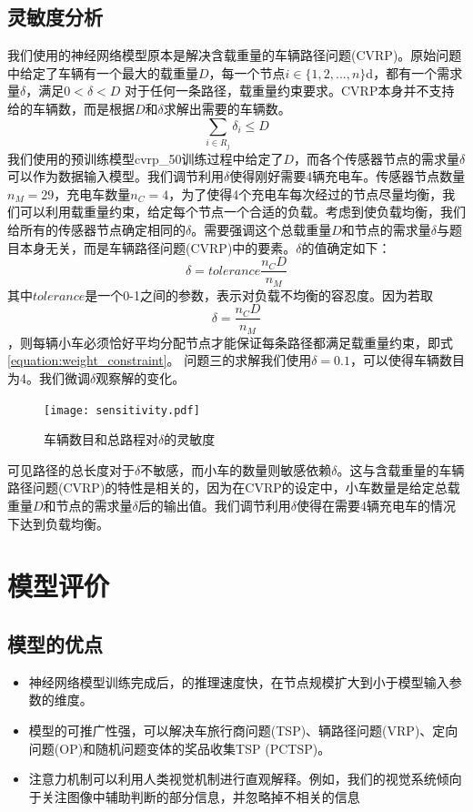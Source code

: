 \documentclass{whutmod}
\begin{document}
\subsection{灵敏度分析}
我们使用的神经网络模型原本是解决含载重量的车辆路径问题(CVRP)。原始问题中给定了车辆有一个最大的载重量$D$，每一个节点$i \in \{1,2,...,n\}$d，都有一个需求量$\delta$，满足$0<\delta<D$
对于任何一条路径，载重量约束要求。CVRP本身并不支持给的车辆数，而是根据$D$和$\delta$求解出需要的车辆数。
\begin{equation}
	\sum_{i \in R_{j}} \delta_{i} \leq D
	\label{equation:weight_constraint}
\end{equation}
我们使用的预训练模型cvrp\_50训练过程中给定了$D$，而各个传感器节点的需求量$\delta$可以作为数据输入模型。我们调节利用$\delta$使得刚好需要4辆充电车。传感器节点数量$n_M=29$，充电车数量$n_C=4$，为了使得4个充电车每次经过的节点尽量均衡，我们可以利用载重量约束，给定每个节点一个合适的负载。考虑到使负载均衡，我们给所有的传感器节点确定相同的$\delta$。需要强调这个总载重量$D$和节点的需求量$\delta$与题目本身无关，而是车辆路径问题(CVRP)中的要素。$\delta$的值确定如下：
\begin{equation}
	\delta = tolerance\frac{n_C D}{n_M}
\end{equation}
其中$tolerance$是一个0-1之间的参数，表示对负载不均衡的容忍度。因为若取$$\delta = \frac{n_C D}{n_M}$$，则每辆小车必须恰好平均分配节点才能保证每条路径都满足载重量约束，即式\ref{equation:weight_constraint}。
问题三的求解我们使用$\delta=0.1$，可以使得车辆数目为4。我们微调$\delta$观察解的变化。

\begin{figure}[!h]
	\centering
	\texttt{[image: sensitivity.pdf]}
	\caption{车辆数目和总路程对$\delta$的灵敏度}
	\label{fig:sensitivity}%
\end{figure}
可见路径的总长度对于$\delta$不敏感，而小车的数量则敏感依赖$\delta$。这与含载重量的车辆路径问题(CVRP)的特性是相关的，因为在CVRP的设定中，小车数量是给定总载重量$D$和节点的需求量$\delta$后的输出值。我们调节利用$\delta$使得在需要4辆充电车的情况下达到负载均衡。
\newpage

\section{模型评价}

\subsection{模型的优点}
\begin{itemize}
	\item 神经网络模型训练完成后，的推理速度快，在节点规模扩大到小于模型输入参数的维度。
	\item 模型的可推广性强，可以解决车旅行商问题(TSP)、辆路径问题(VRP)、定向问题(OP)和随机问题变体的奖品收集TSP (PCTSP)。
	\item 注意力机制可以利用人类视觉机制进行直观解释。例如，我们的视觉系统倾向于关注图像中辅助判断的部分信息，并忽略掉不相关的信息
\end{itemize}
\end{document}
